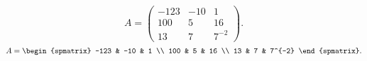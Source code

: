 \documentclass[11pt,a4paper]{article}
\begin{document}
\[
	A =
	\begin{pmatrix}
	-123 & -10 & 1 \\
	100 & 5 & 16 \\
	13 & 7 & 7^{-2}
	\end{pmatrix}.
\]
\[
	A =
	\begin{spmatrix}
	-123 & -10 & 1 \\
	100 & 5 & 16 \\
	13 & 7 & 7^{-2}
	\end{spmatrix}.
\]
\end{document}
